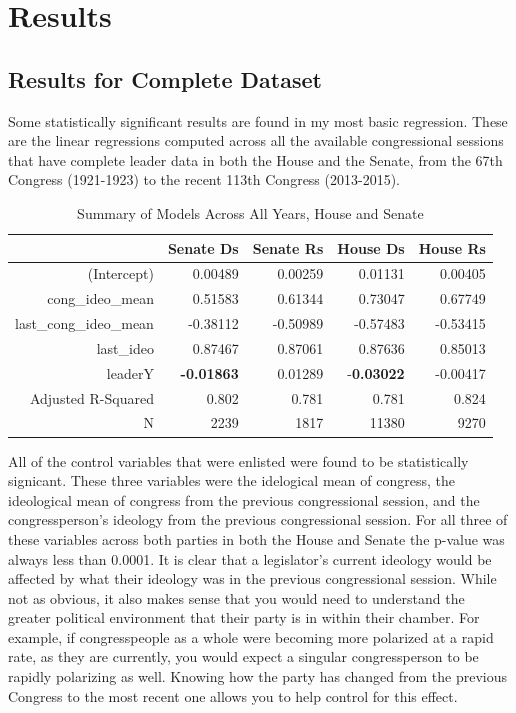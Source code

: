 \documentclass[12pt,twoside]{reedthesis}
\begin{document}
  \chapter{Results}\label{results}
  
  \section{Results for Complete
  Dataset}\label{results-for-complete-dataset}
  
  Some statistically significant results are found in my most basic
  regression. These are the linear regressions computed across all the
  available congressional sessions that have complete leader data in both
  the House and the Senate, from the 67th Congress (1921-1923) to the
  recent 113th Congress (2013-2015).
  
  \begin{table}[h]
  \centering
  \caption{Summary of Models Across All Years, House and Senate}
  \begin{tabular}{r|rrrr}
                         & Senate Ds & Senate Rs & House Ds & House Rs \\ \hline
  (Intercept)            & 0.00489   & 0.00259   & 0.01131  & 0.00405  \\
  cong\_ideo\_mean       & 0.51583   & 0.61344   & 0.73047  & 0.67749  \\
  last\_cong\_ideo\_mean & -0.38112  & -0.50989  & -0.57483 & -0.53415 \\
  last\_ideo             & 0.87467   & 0.87061   & 0.87636  & 0.85013  \\
  leaderY                & \textbf{-0.01863}  & 0.01289   & -\textbf{0.03022} & -0.00417 \\
  Adjusted R-Squared     & 0.802     & 0.781     & 0.781    & 0.824    \\
  N                      & 2239      & 1817      & 11380    & 9270    
  \end{tabular}
  \end{table}
  
  All of the control variables that were enlisted were found to be
  statistically signicant. These three variables were the idelogical mean
  of congress, the ideological mean of congress from the previous
  congressional session, and the congressperson's ideology from the
  previous congressional session. For all three of these variables across
  both parties in both the House and Senate the p-value was always less
  than 0.0001. It is clear that a legislator's current ideology would be
  affected by what their ideology was in the previous congressional
  session. While not as obvious, it also makes sense that you would need
  to understand the greater political environment that their party is in
  within their chamber. For example, if congresspeople as a whole were
  becoming more polarized at a rapid rate, as they are currently, you
  would expect a singular congressperson to be rapidly polarizing as well.
  Knowing how the party has changed from the previous Congress to the most
  recent one allows you to help control for this effect.
  
\end{document}
